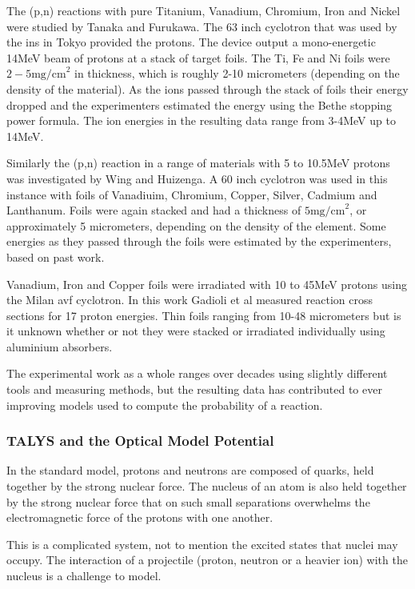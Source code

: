 The (p,n) reactions with pure Titanium, Vanadium, Chromium, Iron and Nickel were studied by Tanaka and Furukawa\cite{exfortanaka}.  The 63 inch cyclotron that was used by the \acrfull{ins} in Tokyo provided the protons.  The device output a mono-energetic 14MeV beam of protons at a stack of target foils.  The Ti, Fe and Ni foils were $2-5 \text{mg/cm}^{2}$ in thickness, which is roughly 2-10 micrometers (depending on the density of the material).  As the ions passed through the stack of foils their energy dropped and the experimenters estimated the energy using the Bethe stopping power formula\cite{stoppingdistance}.  The ion energies in the resulting data range from 3-4MeV up to 14MeV.

Similarly the (p,n) reaction in a range of materials with 5 to 10.5MeV protons was investigated by Wing and Huizenga\cite{exforwing}.  A 60 inch cyclotron was used in this instance with foils of Vanadiuim, Chromium, Copper, Silver, Cadmium and Lanthanum.  Foils were again stacked and had a thickness of $5 \text{mg/cm}^{2}$, or approximately 5 micrometers, depending on the density of the element.  Some energies as they passed through the foils were estimated by the experimenters, based on past work.  

Vanadium, Iron and Copper foils were irradiated with 10 to 45MeV protons using the Milan \acrfull{avf} cyclotron.  In this work Gadioli et al\cite{exforgadioli} measured reaction cross sections for 17 proton energies.  Thin foils ranging from 10-48 micrometers but is it unknown whether or not they were stacked or irradiated individually using aluminium absorbers.

The experimental work as a whole ranges over decades using slightly different tools and measuring methods, but the resulting data has contributed to ever improving models used to compute the probability of a reaction.

\FloatBarrier

\subsubsection{TALYS and the Optical Model Potential}

In the standard model, protons and neutrons are composed of quarks, held together by the strong nuclear force.  The nucleus of an atom is also held together by the strong nuclear force that on such small separations overwhelms the electromagnetic force of the protons with one another.

This is a complicated system, not to mention the excited states that nuclei may occupy.  The interaction of a projectile (proton, neutron or a heavier ion) with the nucleus is a challenge to model.

